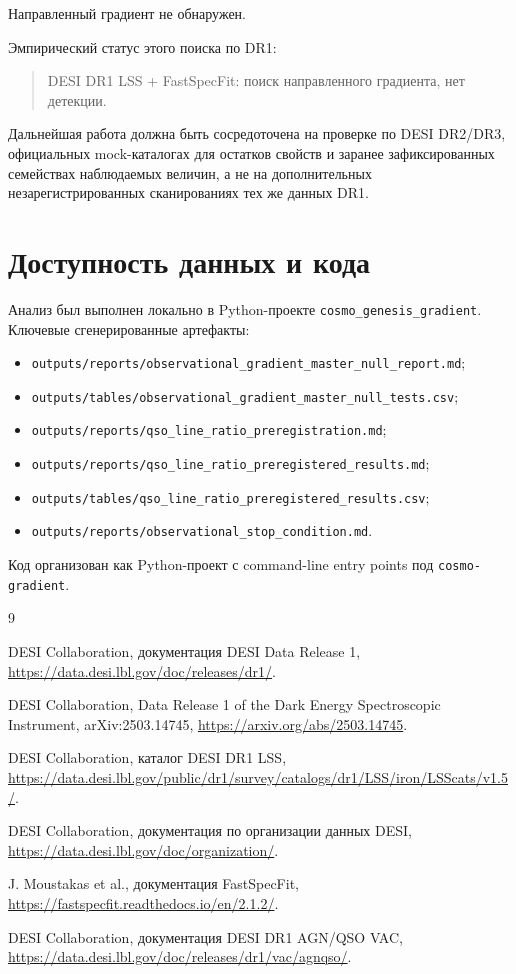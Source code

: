 \documentclass[11pt]{article}
\begin{document}
Направленный градиент не обнаружен.

Эмпирический статус этого поиска по DR1:
\begin{quote}
DESI DR1 LSS + FastSpecFit: поиск направленного градиента, нет детекции.
\end{quote}

Дальнейшая работа должна быть сосредоточена на проверке по DESI DR2/DR3, официальных mock-каталогах для остатков свойств и заранее зафиксированных семействах наблюдаемых величин, а не на дополнительных незарегистрированных сканированиях тех же данных DR1.

\section*{Доступность данных и кода}

Анализ был выполнен локально в Python-проекте \texttt{cosmo\_genesis\_gradient}. Ключевые сгенерированные артефакты:
\begin{itemize}
    \item \texttt{outputs/reports/observational\_gradient\_master\_null\_report.md};
    \item \texttt{outputs/tables/observational\_gradient\_master\_null\_tests.csv};
    \item \texttt{outputs/reports/qso\_line\_ratio\_preregistration.md};
    \item \texttt{outputs/reports/qso\_line\_ratio\_preregistered\_results.md};
    \item \texttt{outputs/tables/qso\_line\_ratio\_preregistered\_results.csv};
    \item \texttt{outputs/reports/observational\_stop\_condition.md}.
\end{itemize}

Код организован как Python-проект с command-line entry points под \texttt{cosmo-gradient}.

\begin{thebibliography}{9}

DESI Collaboration,
\newblock документация DESI Data Release 1,
\newblock \url{https://data.desi.lbl.gov/doc/releases/dr1/}.

DESI Collaboration,
\newblock Data Release 1 of the Dark Energy Spectroscopic Instrument,
\newblock arXiv:2503.14745,
\newblock \url{https://arxiv.org/abs/2503.14745}.

DESI Collaboration,
\newblock каталог DESI DR1 LSS,
\newblock \url{https://data.desi.lbl.gov/public/dr1/survey/catalogs/dr1/LSS/iron/LSScats/v1.5/}.

DESI Collaboration,
\newblock документация по организации данных DESI,
\newblock \url{https://data.desi.lbl.gov/doc/organization/}.

J. Moustakas et al.,
\newblock документация FastSpecFit,
\newblock \url{https://fastspecfit.readthedocs.io/en/2.1.2/}.

DESI Collaboration,
\newblock документация DESI DR1 AGN/QSO VAC,
\newblock \url{https://data.desi.lbl.gov/doc/releases/dr1/vac/agnqso/}.

\end{thebibliography}
\end{document}
